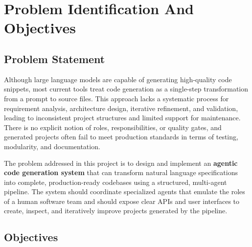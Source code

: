 \chapter{Problem Identification And Objectives}
\section{Problem Statement}

Although large language models are capable of generating high-quality code snippets, most current tools treat code generation as a single-step transformation from a prompt to source files. This approach lacks a systematic process for requirement analysis, architecture design, iterative refinement, and validation, leading to inconsistent project structures and limited support for maintenance. There is no explicit notion of roles, responsibilities, or quality gates, and generated projects often fail to meet production standards in terms of testing, modularity, and documentation.

The problem addressed in this project is to design and implement an \textbf{agentic code generation system} that can transform natural language specifications into complete, production-ready codebases using a structured, multi-agent pipeline. The system should coordinate specialized agents that emulate the roles of a human software team and should expose clear APIs and user interfaces to create, inspect, and iteratively improve projects generated by the pipeline.

\section{Objectives}

